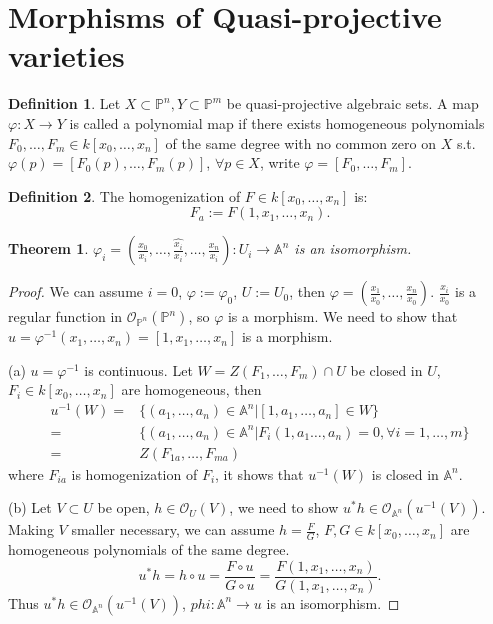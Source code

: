 \documentclass{amsart}
\theoremstyle{plain}
\newtheorem{theorem}{Theorem}
\theoremstyle{definition}
\newtheorem{definition}{Definition}
\theoremstyle{remark}
\numberwithin{equation}{section}
\begin{document}
\section{Morphisms of Quasi-projective varieties}
\begin{definition}
	Let $ X\subset \mathbb{P}^n,Y\subset \mathbb{P}^m $ be quasi-projective algebraic sets. A map $ \varphi:X\to Y $ is called a polynomial map if there exists homogeneous polynomials $ F_0,\dots,F_m\in k[x_0,\dots,x_n] $ of the same degree with no common zero on $ X $ s.t.
	$ \varphi(p)=[F_0(p),\dots,F_m(p)] $, $ \forall p\in X $, write $ \varphi=[F_0,\dots,F_m] $.
\end{definition}
\begin{definition}
	The homogenization of $ F\in k[x_0,\dots,x_n] $ is:
	$$
	F_a:=F(1,x_1,\dots,x_n).
	$$
\end{definition}
\begin{theorem}\label{13}
	$ \varphi_i=(\frac{x_0}{x_i},\dots,\hat{\frac{x_i}{x_i}},\dots,\frac{x_n}{x_i}):U_i\to \mathbb{A}^n $ is an isomorphism.
\end{theorem}
\begin{proof}
	We can assume $ i=0 $, $ \varphi:=\varphi_0 $, $ U:=U_0 $, then $ \varphi=(\frac{x_1}{x_0},\dots,\frac{x_n}{x_0}) $. $ \frac{x_i}{x_0} $ is a regular function in $ \mathcal{O}_{\mathbb{P}^n}(\mathbb{P}^n) $, so $ \varphi $ is a morphism. We need to show that $ u=\varphi^{-1}(x_1,\dots,x_n)=[1,x_1,\dots,x_n] $ is a morphism.

	(a) $ u=\varphi^{-1} $ is continuous. Let $ W=Z(F_1,\dots,F_m)\cap U $ be closed in $ U $, $ F_i\in k[x_0,\dots,x_n] $ are homogeneous, then
	$$\begin{array}{cc}
	u^{-1}(W)= & \{ (a_1,\dots,a_n)\in \mathbb{A}^n|[1,a_1,\dots,a_n]\in W \}\\
	= & \{ (a_1,\dots,a_n)\in \mathbb{A}^n|F_i(1,a_1\dots,a_n)=0, \forall i=1,\dots,m \} \\
	= & Z(F_{1a},\dots,F_{ma})
	\end{array}$$
	where $ F_{ia} $ is homogenization of $ F_i $, it shows that $ u^{-1}(W) $ is closed in $ \mathbb{A}^n  $.

	(b) Let $ V\subset U $ be open, $ h\in \mathcal{O}_U(V) $, we need to show $ u^\ast h\in \mathcal{O}_{\mathbb{A}^n}(u^{-1}(V)) $. Making $ V $ smaller necessary, we can assume $ h=\frac{F}{G} $, $ F,G \in k[x_0,\dots,x_n]$ are homogeneous polynomials of the same degree.
	$$
	u^\ast h = h\circ u=\frac{F\circ u}{G\circ u}=\frac{F(1,x_1,\dots,x_n)}{G(1,x_1,\dots,x_n)}.
	$$
	Thus $ u^\ast h\in \mathcal{O}_{\mathbb{A}^n}(u^{-1}(V)) $, $ phi:\mathbb{A}^n\to u $ is an isomorphism.
\end{proof}
\end{document}
